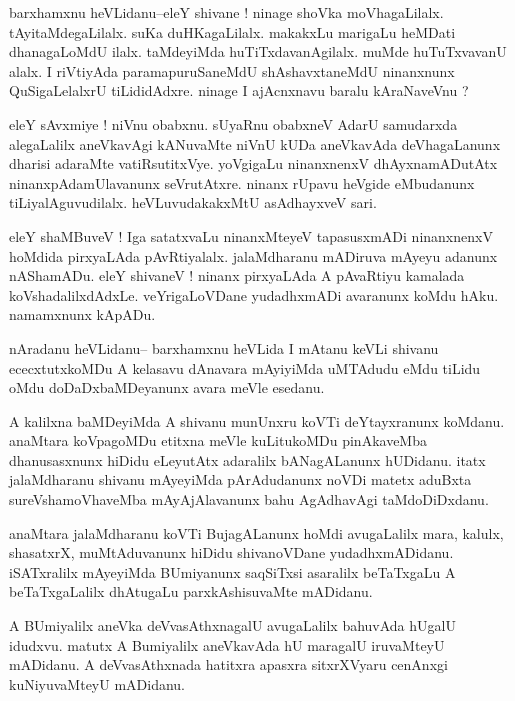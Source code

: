 \documentclass{article}
\begin{document}
\begin{mn}%
barxhamxnu heVLidanu--eleY shivane ! ninage shoVka moVhagaLilalx. tAyitaMdegaLilalx. suKa 
duHKagaLilalx. makakxLu marigaLu heMDati dhanagaLoMdU ilalx. taMdeyiMda huTiTxdavanAgilalx. 
muMde huTuTxvavanU alalx. I riVtiyAda paramapuruSaneMdU shAshavxtaneMdU ninanxnunx 
QuSigaLelalxrU tiLididAdxre. ninage I ajAcnxnavu baralu kAraNaveVnu ?
\end{mn}

\begin{mn}%
eleY sAvxmiye ! niVnu obabxnu. sUyaRnu obabxneV AdarU samudarxda alegaLalilx aneVkavAgi 
kANuvaMte niVnU kUDa aneVkavAda deVhagaLanunx dharisi adaraMte vatiRsutitxVye. yoVgigaLu 
ninanxnenxV dhAyxnamADutAtx ninanxpAdamUlavanunx seVrutAtxre. ninanx rUpavu heVgide 
eMbudanunx tiLiyalAguvudilalx. heVLuvudakakxMtU asAdhayxveV sari.
\end{mn}

\begin{mn}%
eleY shaMBuveV ! Iga satatxvaLu ninanxMteyeV tapasusxmADi ninanxnenxV hoMdida pirxyaLAda 
pAvRtiyalalx. jalaMdharanu mADiruva mAyeyu adanunx nAShamADu. eleY shivaneV ! ninanx 
pirxyaLAda A pAvaRtiyu kamalada koVshadalilxdAdxLe. veYrigaLoVDane yudadhxmADi avaranunx 
koMdu hAku. namamxnunx kApADu.
\end{mn}

\begin{mn}%
nAradanu heVLidanu-- barxhamxnu heVLida I mAtanu keVLi shivanu ececxtutxkoMDu A kelasavu 
dAnavara mAyiyiMda uMTAdudu eMdu tiLidu oMdu doDaDxbaMDeyanunx avara meVle esedanu.
\end{mn}

\begin{mn}%
A kalilxna baMDeyiMda A shivanu munUnxru koVTi deYtayxranunx koMdanu. anaMtara koVpagoMDu 
etitxna meVle kuLitukoMDu pinAkaveMba dhanusasxnunx hiDidu eLeyutAtx adaralilx bANagALanunx 
hUDidanu. itatx jalaMdharanu shivanu mAyeyiMda pArAdudanunx noVDi matetx aduBxta 
sureVshamoVhaveMba mAyAjAlavanunx bahu AgAdhavAgi taMdoDiDxdanu.
\end{mn}

\begin{mn}%
anaMtara jalaMdharanu koVTi BujagALanunx hoMdi avugaLalilx mara, kalulx, shasatxrX, 
muMtAduvanunx hiDidu shivanoVDane yudadhxmADidanu. iSATxralilx mAyeyiMda BUmiyanunx 
saqSiTxsi asaralilx beTaTxgaLu A beTaTxgaLalilx dhAtugaLu parxkAshisuvaMte mADidanu.
\end{mn}

\begin{mn}%
A BUmiyalilx  aneVka deVvasAthxnagalU avugaLalilx bahuvAda hUgalU idudxvu. matutx A 
Bumiyalilx aneVkavAda hU maragalU iruvaMteyU mADidanu. A deVvasAthxnada hatitxra apasxra 
sitxrXVyaru cenAnxgi kuNiyuvaMteyU mADidanu.
\end{mn}
\end{document}
